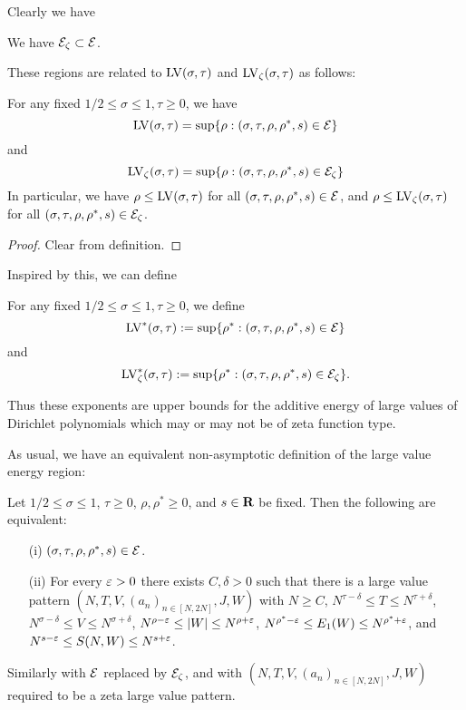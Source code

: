 Clearly we have

\begin{lemma}\label{triv-contain} We have $\mathcal{E}_\zeta \subset \mathcal{E}$.
\end{lemma}

These regions are related to $\mathrm{LV}(\sigma,\tau)$ and $\mathrm{LV}_{\zeta}(\sigma,\tau)$ as follows:

\begin{lemma}\label{energy-region-lv} For any fixed $1/2 \leq \sigma \leq 1, \tau \geq 0$, we have
$$ \mathrm{LV}(\sigma,\tau) = \sup \{ \rho: (\sigma,\tau,\rho,\rho^*,s) \in \mathcal{E}\}$$
and
$$ \mathrm{LV}_\zeta(\sigma,\tau) = \sup \{ \rho: (\sigma,\tau,\rho,\rho^*,s) \in \mathcal{E}_\zeta\}$$
In particular, we have $\rho \leq \mathrm{LV}(\sigma,\tau)$ for all $(\sigma,\tau,\rho,\rho^*,s) \in \mathcal{E}$, and $\rho \leq \mathrm{LV}_\zeta(\sigma,\tau)$ for all $(\sigma,\tau,\rho,\rho^*,s) \in \mathcal{E}_\zeta$.
\end{lemma}

\begin{proof} Clear from definition.
\end{proof}

Inspired by this, we can define

\begin{definition}\label{lvze-def}  For any fixed $1/2 \leq \sigma \leq 1, \tau \geq 0$, we define
$$ \mathrm{LV}^*(\sigma,\tau) := \sup \{ \rho^*: (\sigma,\tau,\rho,\rho^*,s) \in \mathcal{E}\}$$
and
$$ \mathrm{LV}^*_\zeta(\sigma,\tau) := \sup \{ \rho^*: (\sigma,\tau,\rho,\rho^*,s) \in \mathcal{E}_\zeta\}.$$
\end{definition}

Thus these exponents are upper bounds for the additive energy of large values of Dirichlet polynomials which may or may not be of zeta function type.

As usual, we have an equivalent non-asymptotic definition of the large value energy region:

\begin{lemma}\label{lve-asymp} Let $1/2 \leq \sigma \leq 1$, $\tau \geq 0$,  $\rho, \rho^* \geq 0$, and $s \in \mathbf{R}$ be fixed.  Then the following are equivalent:
    \begin{itemize}
    \item[(i)] $(\sigma,\tau,\rho,\rho^*,s) \in \mathcal{E}$.
    \item[(ii)] For every $\varepsilon>0$ there exists $C, \delta > 0$ such that there is a large value pattern $(N,T,V,(a_n)_{n \in [N,2N]},J,W)$ with $N \geq C$, $N^{\tau-\delta} \leq T \leq N^{\tau+\delta}$, $N^{\sigma-\delta} \leq V \leq N^{\sigma+\delta}$,
    $N^{\rho-\varepsilon} \leq |W| \leq N^{\rho+\varepsilon}$,
    $N^{\rho^*-\varepsilon} \leq E_1(W) \leq N^{\rho^*+\varepsilon}$, and
    $N^{s-\varepsilon} \leq S(N, W) \leq N^{s+\varepsilon}$.
    \end{itemize}
    Similarly with $\mathcal{E}$ replaced by $\mathcal{E}_\zeta$, and with $(N,T,V,(a_n)_{n \in [N,2N]},J,W)$ required to be a zeta large value pattern.
\end{lemma}

